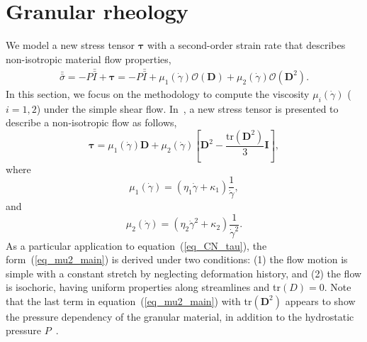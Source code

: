 \section{Granular rheology}
We model a new stress tensor $\bm \tau$ with a second-order strain rate that describes non-isotropic material flow properties,
\begin{align}
  \bar{\bar{\sigma}}
    = -P \bar{\bar{I}}  + \bm{\tau}
    =  -P \bar{\bar{I}}  
    + \mu_1(\dot{\gamma}) \mathcal{O}({\bm D})
    + \mu_2(\dot{\gamma}) \mathcal{O}({\bm D^2}).
  \end{align}
In this section, we focus on the methodology to compute the viscosity $\mu_i ({\dot{\gamma}})$ ($i = 1,2$) under the simple shear flow. 
In~\cite{srivastava_viscometric_2021}, a new stress tensor is presented to describe a non-isotropic flow as follows,
\begin{equation}
  {\bm {\bm \tau}}
  = \mu_1(\dot{\gamma}) {\bm D}
  +  
 \mu_2 (\dot{\gamma})
  \left[ {\bm D}^2  - \frac{\text{tr}\left({\bm D}^2\right)}{3}{\bm I} \right],
\label{eq_2ndOrder_tau}
\end{equation}
where 
\begin{equation}
  \mu_1 (\dot{\gamma})
   = \left( \eta_1 \dot{\gamma}+ \kappa_1 \right) \frac{1}{\dot{\gamma}},
\label{eq_mu1_main}
\end{equation}
and 
\begin{equation}
  \mu_2 (\dot{\gamma}) = 
  \left( \eta_2  \dot{\gamma}^2
  +  \kappa_2 
  \right) \frac{1}{\dot{\gamma}^2}.
  \label{eq_mu2_main}
\end{equation}
As a particular application to equation~(\ref{eq_CN_tau}), the form~(\ref{eq_mu2_main}) is derived under two conditions:
(1) the flow motion is simple with a constant stretch by neglecting deformation history, and (2) the flow is isochoric, having uniform properties along streamlines and tr$(D) = 0$. 
Note that the last term in equation~(\ref{eq_mu2_main}) with tr$\left( \bm D^2 \right)$ appears to show the pressure dependency of the granular material, in addition to the hydrostatic pressure $P$~\cite{rajagopal_implicit_2006}.



